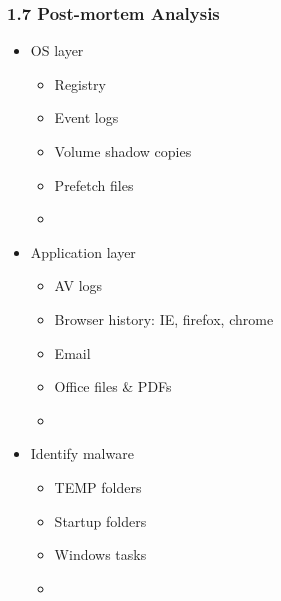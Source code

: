 \begin{frame}
  \frametitle{1.7 Post-mortem Analysis}
  \begin{itemize}
      \item OS layer
        \begin{itemize}
            \item[] Registry
            \item[] Event logs
            \item[] Volume shadow copies
            \item[] Prefetch files
            \item[]
        \end{itemize}
      \item Application layer
        \begin{itemize}
            \item[] AV logs
            \item[] Browser history: IE, firefox, chrome
            \item[] Email
            \item[] Office files \& PDFs
            \item[]
        \end{itemize}
      \item Identify malware
        \begin{itemize}
            \item[] TEMP folders
            \item[] Startup folders
            \item[] Windows tasks
            \item[]
        \end{itemize}
  \end{itemize}
\end{frame}


